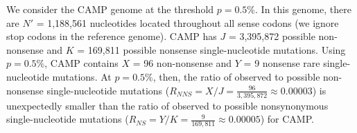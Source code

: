 We consider the CAMP genome at the threshold $p = 0.5\%$.
%
In this genome, there are $N'$ = 1,188,561 nucleotides
located throughout all sense codons (we ignore stop codons in the reference genome).
%
CAMP has $J$ = 3,395,872 possible non-nonsense and
$K$ = 169,811 possible nonsense single-nucleotide mutations.
%
Using $p = 0.5\%$, CAMP contains
$X$ = 96 non-nonsense and
$Y$ = 9 nonsense rare single-nucleotide mutations.
%
At $p = 0.5\%$, then, the ratio of observed to possible non-nonsense single-nucleotide mutations
($R_{NNS} = X / J = \frac{96}{3,395,872}
\approx 0.00003$)
is unexpectedly smaller than the ratio of observed to possible nonsynonymous single-nucleotide mutations
($R_{NS} = Y / K = \frac{9}{169,811}
\approx 0.00005$)
for CAMP.
\endinput